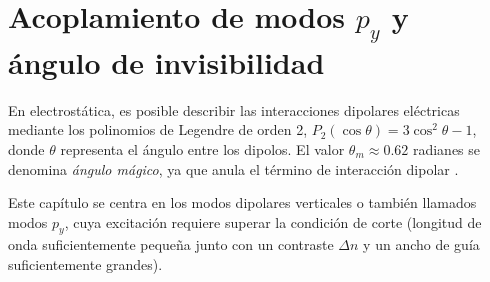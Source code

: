 \chapter{Acoplamiento de modos $p_y$ y ángulo de invisibilidad \label{cap:invisibility}}

En electrostática, es posible describir las interacciones dipolares eléctricas mediante los polinomios de Legendre de orden 2, $P_2(\cos\theta) = 3\cos^2\theta - 1$, donde $\theta$ representa el ángulo entre los dipolos. El valor $\theta_m \approx 0.62$ radianes se denomina \textit{ángulo mágico}, ya que anula el término de interacción dipolar \citep{medmagic}.

Este capítulo se centra en los modos dipolares verticales o también llamados modos $p_y$, cuya excitación requiere superar la condición de corte (longitud de onda suficientemente pequeña junto con un contraste $\Delta n$ y un ancho de guía suficientemente grandes).
